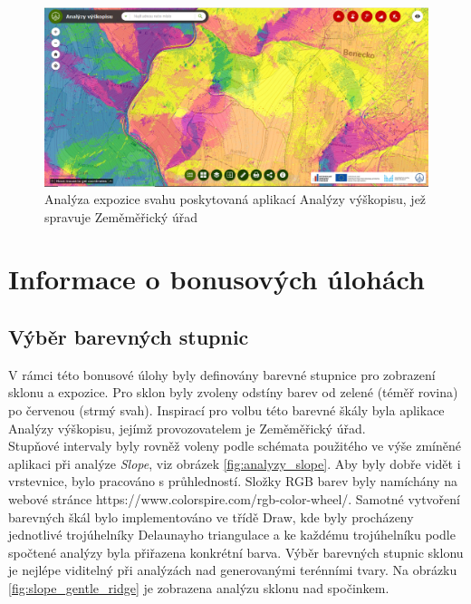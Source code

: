 \documentclass[a4paper,11pt,twoside]{article}
\begin{document}
\vspace{0.2cm}
\begin{figure}[hbt!] 
\begin{center}
\includegraphics[width=15cm]{pictures/analyzy_orientace.PNG} 
\caption[Analýza expozice svahu poskytovaná aplikací Analýzy výškopisu, jež spravuje Zeměměřický úřad]{Analýza expozice svahu poskytovaná aplikací Analýzy výškopisu, jež spravuje Zeměměřický úřad \cite{analyzyCUZK}}
\label{fig:jar}
\end{center}
\end{figure}

\section{Informace o bonusových úlohách}

\subsection{Výběr barevných stupnic}
V rámci této bonusové úlohy byly definovány barevné stupnice pro zobrazení sklonu a expozice. Pro sklon byly zvoleny odstíny barev od zelené (téměř rovina) po červenou (strmý svah). Inspirací pro volbu této barevné škály byla aplikace Analýzy výškopisu, jejímž provozovatelem je Zeměměřický úřad. \\
\indent Stupňové intervaly byly rovněž voleny podle schémata použitého ve výše zmíněné aplikaci při analýze \textit{Slope}, viz obrázek \ref{fig:analyzy_slope}. Aby byly dobře vidět i vrstevnice, bylo pracováno s průhledností. Složky RGB barev byly namíchány na webové stránce https://www.colorspire.com/rgb-color-wheel/. Samotné vytvoření barevných škál bylo implementováno ve třídě Draw, kde byly procházeny jednotlivé trojúhelníky Delaunayho triangulace a ke každému trojúhelníku podle spočtené analýzy byla přiřazena konkrétní barva. Výběr barevných stupnic sklonu je nejlépe viditelný při analýzách nad generovanými terénními tvary. Na obrázku  \ref{fig:slope_gentle_ridge} je zobrazena analýzu sklonu nad spočinkem.
\end{document}
